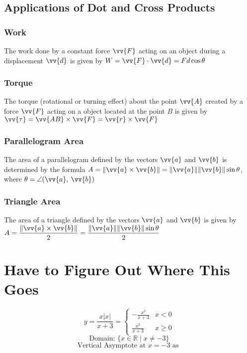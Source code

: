 \documentclass{article}
\newcommand{\mv}[1]{
	\lVert\vv{#1}\rVert
}
\begin{document}
	\subsection{Applications of Dot and Cross Products}
	\subsubsection{Work}
	The work done by a constant force $\vv{F}$ acting on an object during a displacement $\vv{d}$ is given by $W=\vv{F}\cdot\vv{d}=Fd\cos\theta$
	\subsubsection{Torque}
	The torque (rotational or turning effect) about the point $\vv{A}$ created by a force $\vv{F}$ acting on a object located at the point $B$ is given by $\vv{\tau}=\vv{AB}\times\vv{F}=\vv{r}\times\vv{F}$
	\subsubsection{Parallelogram Area}
	The area of a parallelogram defined by the vectors $\vv{a}$ and $\vv{b}$ is determined by the formula $A=\lVert\vv{a}\times\vv{b}\rVert=\mv{a}\mv{b}\sin\theta$, where $\theta=\angle(\vv{a},\:\vv{b})$
	\subsubsection{Triangle Area}
	The area of a triangle defined by the vectors $\vv{a}$ and $\vv{b}$ is given by $A=\dfrac{\lVert\vv{a}\times\vv{b}\rVert}{2}=\dfrac{\mv{a}\mv{b}\sin\theta}{2}$


	\section{Have to Figure Out Where This Goes}
	\[y=\frac{x|x|}{x+3}=\begin{cases}
		-\frac{x^2}{x+3}&x<0\\
		\frac{x^2}{x+3}&x\geq0
	\end{cases}\]
	\[\text{Domain: }\{x\in\mathbb{R}\mid x\neq-3\}\]
	\[\text{Vertical Asymptote at }x=-3\text{ as }\]
	
	
\end{document}
